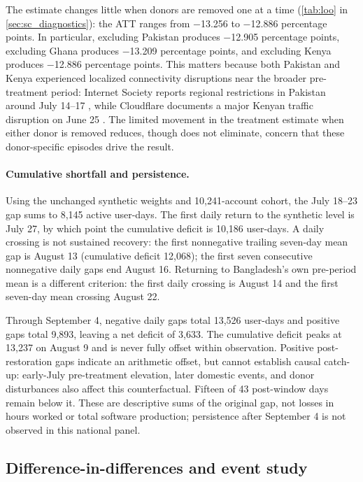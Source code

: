 The estimate changes little when donors are removed one at a time (\cref{tab:loo} in \cref{sec:sc_diagnostics}): the ATT ranges from $-$13.256 to $-$12.886 percentage points. In particular, excluding Pakistan produces $-$12.905 percentage points, excluding Ghana produces $-$13.209 percentage points, and excluding Kenya produces $-$12.886 percentage points. This matters because both Pakistan and Kenya experienced localized connectivity disruptions near the broader pre-treatment period: Internet Society reports regional restrictions in Pakistan around July 14--17 \citep{isoc2024pakbal,isoc2024pakpun}, while Cloudflare documents a major Kenyan traffic disruption on June 25 \citep{cloudflare2024}.
The limited movement in the treatment estimate when either donor is removed reduces, though does not eliminate, concern that these donor-specific episodes drive the result.

\paragraph{Cumulative shortfall and persistence.}
Using the unchanged synthetic weights and 10,241-account cohort, the July 18--23 gap sums to 8,145 active user-days. The first daily return to the synthetic level is July 27, by which point the cumulative deficit is 10,186 user-days. A daily crossing is not sustained recovery: the first nonnegative trailing seven-day mean gap is August 13 (cumulative deficit 12,068); the first seven consecutive nonnegative daily gaps end August 16. Returning to Bangladesh's own pre-period mean is a different criterion: the first daily crossing is August 14 and the first seven-day mean crossing August 22.

Through September 4, negative daily gaps total 13,526 user-days and positive gaps total 9,893, leaving a net deficit of 3,633. The cumulative deficit peaks at 13,237 on August 9 and is never fully offset within observation. Positive post-restoration gaps indicate an arithmetic offset, but cannot establish causal catch-up: early-July pre-treatment elevation, later domestic events, and donor disturbances also affect this counterfactual. Fifteen of 43 post-window days remain below it. These are descriptive sums of the original gap, not losses in hours worked or total software production; persistence after September 4 is not observed in this national panel.

\subsection{Difference-in-differences and event study}
\label{sec:did_results}

